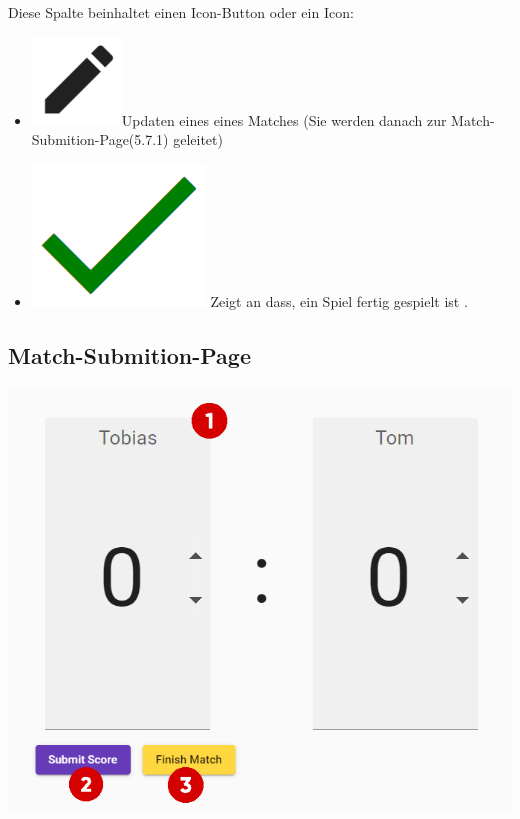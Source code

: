 Diese Spalte beinhaltet einen Icon-Button oder ein Icon:
\begin{itemize}
    \item \includegraphics[scale=0.3]{pics/user-guide/edit-icon.PNG}Updaten eines eines Matches (Sie werden danach zur Match-Submition-Page(5.7.1) geleitet)
    \item \includegraphics[scale=0.2]{pics/user-guide/finished-icon.PNG} Zeigt an dass, ein Spiel fertig gespielt ist .
\end{itemize}

\bigskip
\subsection{Match-Submition-Page}

\includegraphics[scale=0.6]{pics/user-guide/match-submition-page.PNG}

